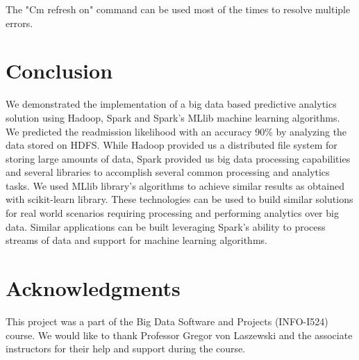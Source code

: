 \documentclass[9pt,twocolumn,twoside]{../../styles/osajnl}
\begin{document}
The "Cm refresh on" command can be used most of the times to resolve multiple errors.









    
    

\section{Conclusion}
We demonstrated the implementation of a big data based  predictive analytics solution using Hadoop, Spark and Spark’s MLlib machine learning algorithms. We predicted the readmission likelihood with an accuracy 90$\%$ by analyzing the data stored on HDFS.  While Hadoop provided us a distributed file system for storing large amounts of data, Spark provided us big data processing capabilities and several libraries to accomplish several common processing and analytics tasks. We used MLlib library’s algorithms to achieve similar results as obtained with scikit-learn library. These technologies can be used to build similar solutions for real world scenarios requiring processing and performing analytics over big data.  Similar applications can be built leveraging   Spark’s ability to process streams of data and support for machine learning algorithms. 

\section{Acknowledgments}
This project was a part of the Big Data Software and Projects (INFO-I524) course. We would like to thank Professor Gregor von Laszewski and the associate instructors for their help and support during the course. 


\end{document}
